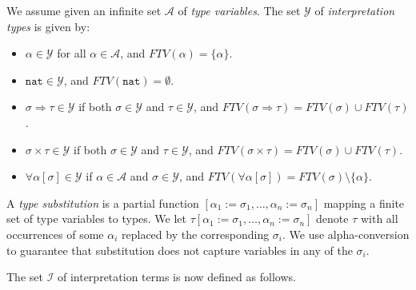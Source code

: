 \documentclass[runningheads,a4paper]{llncs}
\newcommand{\Iterms}{\mathcal{I}}
\newcommand{\Typevars}{\mathcal{A}}
\newcommand{\ITypes}{\mathcal{Y}}
\newcommand{\quant}[2]{\forall #1[#2]}
\newcommand{\arrtype}{\Rightarrow}
\newcommand{\FTV}{\mathit{FTV}}
\newcommand{\nat}{\mathtt{nat}}
\begin{document}
\begin{definition}\label{def:itypes}
We assume given an infinite set $\Typevars$ of \emph{type variables}.
The set $\ITypes$ of \emph{interpretation types} is given by:
\begin{itemize}
\item $\alpha \in \ITypes$ for all $\alpha \in \Typevars$, and
  $\FTV(\alpha) = \{ \alpha \}$.
\item $\nat \in \ITypes$, and $\FTV(\nat) = \emptyset$.
\item $\sigma \arrtype \tau \in \ITypes$ if both $\sigma \in \ITypes$
  and $\tau \in \ITypes$, and $\FTV(\sigma \arrtype \tau) = \FTV(\sigma)
  \cup \FTV(\tau)$.
\item $\sigma \times \tau \in \ITypes$ if both $\sigma \in \ITypes$
  and $\tau \in \ITypes$, and $\FTV(\sigma \times \tau) = \FTV(\sigma)
  \cup \FTV(\tau)$.
\item $\quant{\alpha}{\sigma} \in \ITypes$ if $\alpha \in \Typevars$ and
  $\sigma \in \ITypes$, and $\FTV(\quant{\alpha}{\sigma}) =
  \FTV(\sigma) \setminus \{ \alpha \}$.
\end{itemize}
\end{definition}

\begin{definition}\label{def:typesubst}
A \emph{type substitution} is a partial function $[\alpha_1:=\sigma_1,
\dots,\alpha_n:=\sigma_n]$ mapping a finite set of type variables to
types.  We let $\tau[\alpha_1:=\sigma_1,\dots,\alpha_n:=\sigma_n]$
denote $\tau$ with all occurrences of some $\alpha_i$ replaced by the
corresponding $\sigma_i$.  We use alpha-conversion to guarantee that
substitution does not capture variables in any of the $\sigma_i$.
\end{definition}

The set $\Iterms$ of interpretation terms is now defined as follows.
\end{document}
